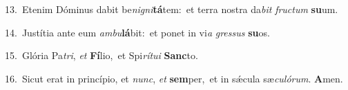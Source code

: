 {\numbfont\textcolor{\numbcolor}{13.}}~Etenim Dóminus dabit be\-\textit{ni}\-\textit{gni}\textbf{tá}tem:~\star et terra nostra da\textit{bit} \textit{fruc}\-\textit{tum} \textbf{su}\-um.\par
{\numbfont\textcolor{\numbcolor}{14.}}~Justítia ante eum \textit{am}\-\textit{bu}\textbf{lá}bit:~\star et ponet in vi\textit{a} \textit{gres}\-\textit{sus} \textbf{su}\-os.\par
{\numbfont\textcolor{\numbcolor}{15.}}~Glória Pa\-\textit{tri}\-, \textit{et} \textbf{Fí}\-lio,~\star et Spi\-\textit{rí}\-\textit{tu}\textit{i} \textbf{Sanc}\-to.\par
{\numbfont\textcolor{\numbcolor}{16.}}~Sicut erat in princípio, et \textit{nunc}\-, \textit{et} \textbf{sem}\-per,~\star et in sǽcula sæ\-\textit{cu}\-\textit{ló}\textit{rum}. \textbf{A}\-men.\par
